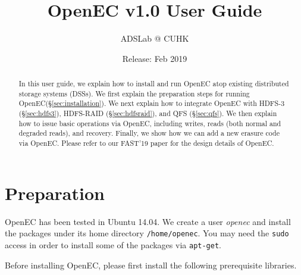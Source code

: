 \documentclass[letterpaper,12pt]{article}
\title{{\bf OpenEC v1.0 User Guide}}
\author{ADSLab @ CUHK}
\date{Release: Feb 2019\\}
\newcommand{\openec}{{\sf\small OpenEC}\xspace}
\begin{document}
\maketitle


\tableofcontents

\clearpage

\begin{abstract}
In this user guide, we explain how to install and run \openec atop existing
distributed storage systems (DSSs).  We first explain the preparation steps
for running \openec (\S\ref{sec:installation}).  We next explain how to
integrate \openec with HDFS-3 (\S\ref{sec:hdfs3}), HDFS-RAID
(\S\ref{sec:hdfsraid}), and QFS (\S\ref{sec:qfs}).  We then explain how to
issue basic operations via \openec, including writes, reads (both normal and
degraded reads), and recovery.  Finally, we show how we can add a new erasure
code via \openec.  Please refer to our FAST'19 paper for the design details of
\openec. 
\end{abstract}



\section{Preparation}
\label{sec:installation}

\openec has been tested in Ubuntu 14.04.  We create a user {\sl openec} and
install the packages under its home directory {\tt /home/openec}.  You may
need the {\tt sudo} access in order to install some of the packages via
{\tt apt-get}. 

Before installing \openec, please first install the following prerequisite
libraries.  
\end{document}
